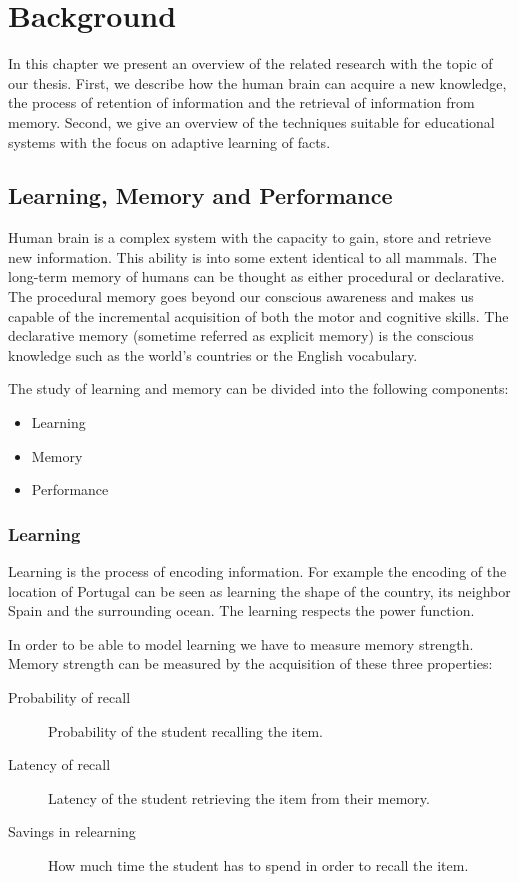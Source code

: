 \chapter{Background}

In this chapter we present an overview of the related research with the topic of our thesis. First, we describe how the human brain can acquire a new knowledge, the process of retention of information and the retrieval of information from memory. Second, we give an overview of the techniques suitable for educational systems with the focus on adaptive learning of facts.

\section{Learning, Memory and Performance}

Human brain is a complex system with the capacity to gain, store and retrieve new information. This ability is into some extent identical to all mammals. The long-term memory of humans can be thought as either procedural or declarative. The procedural memory goes beyond our conscious awareness and makes us capable of the incremental acquisition of both the motor and cognitive skills. The declarative memory (sometime referred as explicit memory) is the conscious knowledge such as the world's countries or the English vocabulary.

The study of learning and memory can be divided into the following components:

\begin{itemize}
  \item Learning
  \item Memory
  \item Performance
\end{itemize}

\subsection{Learning}

Learning is the process of encoding information. For example the encoding of the location of Portugal can be seen as learning the shape of the country,  its neighbor Spain and the surrounding ocean. The learning respects the power function.

In order to be able to model learning we have to measure memory strength. Memory strength can be measured by the acquisition of these three properties:

\begin{description}
  \item[Probability of recall] Probability of the student recalling the item.
  \item[Latency of recall] Latency of the student retrieving the item from their memory.
  \item[Savings in relearning] How much time the student has to spend in order to recall the item.
\end{description}

